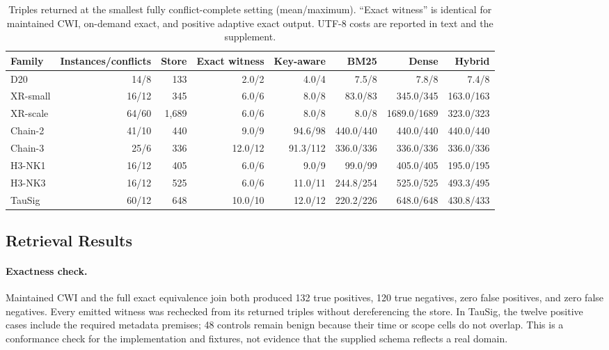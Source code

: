 \documentclass[letterpaper]{article} %
\newcommand{\cwi}{\textsc{CWI}}
\begin{document}
\begin{table}[t]
\centering
\small
\setlength{\tabcolsep}{3.7pt}
\begin{tabular}{lrrrrrrr}
\toprule
Family & Instances/conflicts & Store & Exact witness & Key-aware & BM25 & Dense & Hybrid \\
\midrule
D20       & 14/8  & 133   & 2.0/2   & 4.0/4   & 7.5/8       & 7.8/8       & 7.4/8 \\
XR-small  & 16/12 & 345   & 6.0/6   & 8.0/8   & 83.0/83     & 345.0/345   & 163.0/163 \\
XR-scale  & 64/60 & 1,689 & 6.0/6   & 8.0/8   & 8.0/8       & 1689.0/1689 & 323.0/323 \\
Chain-2   & 41/10 & 440   & 9.0/9   & 94.6/98 & 440.0/440   & 440.0/440   & 440.0/440 \\
Chain-3   & 25/6  & 336   & 12.0/12 & 91.3/112& 336.0/336   & 336.0/336   & 336.0/336 \\
H3-NK1    & 16/12 & 405   & 6.0/6   & 9.0/9   & 99.0/99     & 405.0/405   & 195.0/195 \\
H3-NK3    & 16/12 & 525   & 6.0/6   & 11.0/11 & 244.8/254   & 525.0/525   & 493.3/495 \\
TauSig    & 60/12 & 648   & 10.0/10 & 12.0/12 & 220.2/226   & 648.0/648   & 430.8/433 \\
\bottomrule
\end{tabular}
\caption{Triples returned at the smallest fully conflict-complete setting
(mean/maximum). ``Exact witness'' is identical for maintained \cwi{},
on-demand exact, and positive adaptive exact output.  UTF-8 costs are reported
in text and the supplement.}
\label{tab:ret}
\end{table}

\subsection{Retrieval Results}

\paragraph{Exactness check.}
Maintained \cwi{} and the full exact equivalence join both produced
132 true positives, 120 true negatives, zero false positives, and zero false
negatives.  Every emitted witness was rechecked from its returned triples
without dereferencing the store.  In TauSig, the twelve positive cases include
the required metadata premises; 48 controls remain benign because their time
or scope cells do not overlap.  This is a conformance check for the
implementation and fixtures, not evidence that the supplied schema reflects a
real domain.
\end{document}
